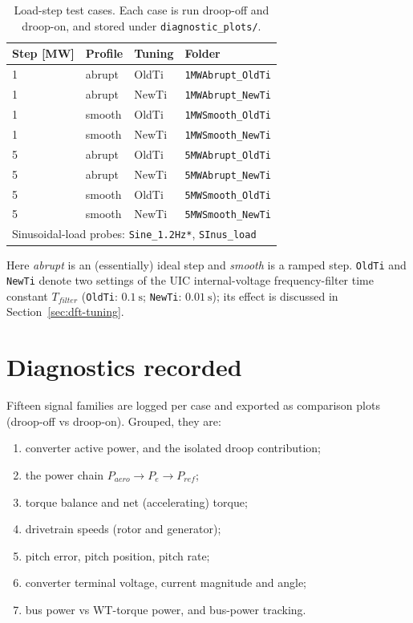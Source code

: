 \documentclass[11pt]{article}
\begin{document}
\begin{table}[htbp]
  \centering
  \caption{Load-step test cases. Each case is run droop-off and droop-on, and
           stored under \texttt{diagnostic\_plots/}.}
  \label{tab:dft-matrix}
  \begin{tabular}{llll}
    \toprule
    Step [\si{\mega\watt}] & Profile & Tuning & Folder \\
    \midrule
    1 & abrupt & OldTi & \texttt{1MWAbrupt\_OldTi}\\
    1 & abrupt & NewTi & \texttt{1MWAbrupt\_NewTi}\\
    1 & smooth & OldTi & \texttt{1MWSmooth\_OldTi}\\
    1 & smooth & NewTi & \texttt{1MWSmooth\_NewTi}\\
    5 & abrupt & OldTi & \texttt{5MWAbrupt\_OldTi}\\
    5 & abrupt & NewTi & \texttt{5MWAbrupt\_NewTi}\\
    5 & smooth & OldTi & \texttt{5MWSmooth\_OldTi}\\
    5 & smooth & NewTi & \texttt{5MWSmooth\_NewTi}\\
    \midrule
    \multicolumn{4}{l}{Sinusoidal-load probes: \texttt{Sine\_1.2Hz*}, \texttt{SInus\_load}}\\
    \bottomrule
  \end{tabular}
\end{table}

\noindent Here \emph{abrupt} is an (essentially) ideal step and \emph{smooth} is
a ramped step. \texttt{OldTi} and \texttt{NewTi} denote two settings of the UIC
internal-voltage frequency-filter time constant \(T_{filter}\)
(\texttt{OldTi}: \(\SI{0.1}{\second}\); \texttt{NewTi}: \(\SI{0.01}{\second}\));
its effect is discussed in Section~\ref{sec:dft-tuning}.

\section{Diagnostics recorded}
\label{sec:dft-diag}
Fifteen signal families are logged per case and exported as comparison plots
(droop-off vs droop-on). Grouped, they are:
\begin{enumerate}
  \item converter active power, and the isolated droop contribution;
  \item the power chain \(P_{aero}\rightarrow P_{e}\rightarrow P_{ref}\);
  \item torque balance and net (accelerating) torque;
  \item drivetrain speeds (rotor and generator);
  \item pitch error, pitch position, pitch rate;
  \item converter terminal voltage, current magnitude and angle;
  \item bus power vs WT-torque power, and bus-power tracking.
\end{enumerate}
\end{document}
